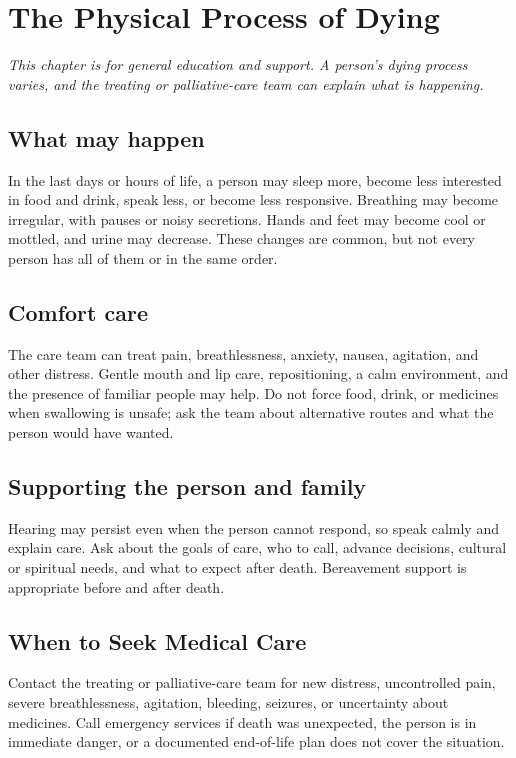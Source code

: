 \chapter{The Physical Process of Dying}

\medskip
\noindent\textit{This chapter is for general education and support. A person’s dying process varies, and the treating or palliative-care team can explain what is happening.}

\section*{What may happen}
In the last days or hours of life, a person may sleep more, become less interested in food and drink, speak less, or become less responsive. Breathing may become irregular, with pauses or noisy secretions. Hands and feet may become cool or mottled, and urine may decrease. These changes are common, but not every person has all of them or in the same order.

\section*{Comfort care}
The care team can treat pain, breathlessness, anxiety, nausea, agitation, and other distress. Gentle mouth and lip care, repositioning, a calm environment, and the presence of familiar people may help. Do not force food, drink, or medicines when swallowing is unsafe; ask the team about alternative routes and what the person would have wanted.

\section*{Supporting the person and family}
Hearing may persist even when the person cannot respond, so speak calmly and explain care. Ask about the goals of care, who to call, advance decisions, cultural or spiritual needs, and what to expect after death. Bereavement support is appropriate before and after death.

\section*{When to Seek Medical Care}
Contact the treating or palliative-care team for new distress, uncontrolled pain, severe breathlessness, agitation, bleeding, seizures, or uncertainty about medicines. Call emergency services if death was unexpected, the person is in immediate danger, or a documented end-of-life plan does not cover the situation.

